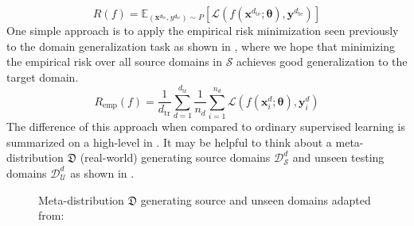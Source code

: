 \begin{equation}
\label{eq:domain_risk}
    R(f) = \mathbb{E}_{(\mathbf{x}^{d_{\mathrm{te}}}, y^{d_{\mathrm{te}}}) \sim P}[\mathcal{L}(f(\mathbf{x}^{d_{\mathrm{te}}}; \boldsymbol{\theta}), \mathbf{y}^{d_{\mathrm{te}}})]
\end{equation}
One simple approach is to apply the empirical risk minimization seen previously to the domain generalization task as shown in , where we hope that minimizing the empirical risk over all source domains in $\mathcal{S}$ achieves good generalization to the target domain.
\begin{equation}
\label{eq:domain_risk_emp}
    R_\mathrm{emp}(f) = \frac{1}{d_\mathrm{tr}} \sum_{d=1}^{d_\mathrm{tr}} \frac{1}{n_d} \sum_{i=1}^{n_d} \mathcal{L}(f(\mathbf{x}_i^{d}; \boldsymbol{\theta}), \mathbf{y}_i^{d})
\end{equation}
The difference of this approach when compared to ordinary supervised learning is summarized on a high-level in . It may be helpful to think about a meta-distribution $\mathfrak{D}$ (real-world) generating source domains $\mathcal{D}^d_\mathcal{S}$ and unseen testing domains $\mathcal{D}^d_\mathcal{U}$ as shown in .
\begin{figure}[htbp]
    \centering
    \caption[Meta-distribution $\mathfrak{D}$ generating source and unseen domains]{Meta-distribution $\mathfrak{D}$ generating source and unseen domains adapted from: \citep{albuquerque2019generalizing}}
    \label{fig:meta_domain}
\end{figure}

